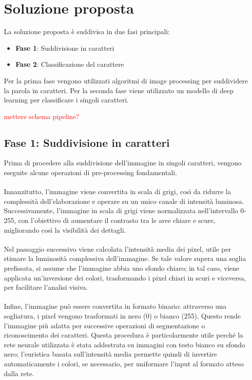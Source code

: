 \chapter{Soluzione proposta}

La soluzione proposta è suddivisa in due fasi principali:
\begin{itemize}
	\item \textbf{Fase 1}: Suddivisione in caratteri
	\item \textbf{Fase 2}: Classificazione del carattere
\end{itemize}

Per la prima fase vengono utilizzati algoritmi di image processing per suddividere la parola in caratteri. Per la seconda fase viene utilizzato un modello di deep learning per classificare i singoli caratteri.

\textcolor{red}{mettere schema pipeline?}

\section{Fase 1: Suddivisione in caratteri}

Prima di procedere alla suddivisione dell'immagine in singoli caratteri, vengono eseguite alcune operazioni di pre-processing fondamentali. \\ \\ Innanzitutto, l'immagine viene convertita in scala di grigi, così da ridurre la complessità dell'elaborazione e operare su un unico canale di intensità luminosa. Successivamente, l'immagine in scala di grigi viene normalizzata nell'intervallo 0-255, con l'obiettivo di aumentare il contrasto tra le aree chiare e scure, migliorando così la visibilità dei dettagli. \\ \\ Nel passaggio successivo viene calcolata l’intensità media dei pixel, utile per stimare la luminosità complessiva dell’immagine. Se tale valore supera una soglia prefissata, si assume che l’immagine abbia uno sfondo chiaro; in tal caso, viene applicata un’inversione dei colori, trasformando i pixel chiari in scuri e viceversa, per facilitare l’analisi visiva. \\ \\ Infine, l'immagine può essere convertita in formato binario: attraverso una sogliatura, i pixel vengono trasformati in nero (0) o bianco (255). Questo rende l’immagine più adatta per successive operazioni di segmentazione o riconoscimento dei caratteri. Questa procedura è particolarmente utile perché la rete neurale utilizzata è stata addestrata su immagini con testo bianco su sfondo nero; l’euristica basata sull’intensità media permette quindi di invertire automaticamente i colori, se necessario, per uniformare l’input al formato atteso dalla rete.
\newline

